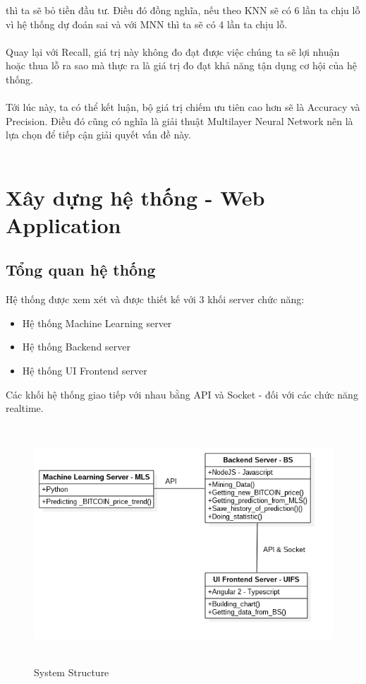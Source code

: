 thì ta sẽ bỏ tiền đầu tư. Điều đó đồng nghĩa, nếu theo KNN sẽ có 6 lần ta chịu 
lỗ vì hệ thống dự đoán sai và với MNN thì ta sẽ có 4 lần ta chịu lỗ.\\\\
Quay lại với Recall, giá trị này không đo đạt được việc chúng ta sẽ lợi nhuận 
hoặc thua lỗ ra sao mà thực ra là giá trị đo đạt khả năng tận dụng cơ hội của hệ 
thống.\\\\
Tới lúc này, ta có thể kết luận, bộ giá trị chiếm ưu tiên cao hơn sẽ là Accuracy 
và Precision. Điều đó cũng có nghĩa là giải thuật Multilayer Neural Network nên 
là lựa chọn để tiếp cận giải quyết vấn đề này.\\\\

\section{Xây dựng hệ thống - Web Application}
\subsection{Tổng quan hệ thống}
Hệ thống được xem xét và được thiết kế với 3 khối server chức năng:
\begin{itemize}
\item Hệ thống Machine Learning server
\item Hệ thống Backend server
\item Hệ thống UI Frontend server
\end{itemize}
Các khối hệ thống giao tiếp với nhau bằng API và Socket - đối với các chức năng
realtime.\\
\begin{figure}[h!]
\centering
\includegraphics[height=3.5in, keepaspectratio=true]{system.png}
\caption{System Structure}
\end{figure}\\

